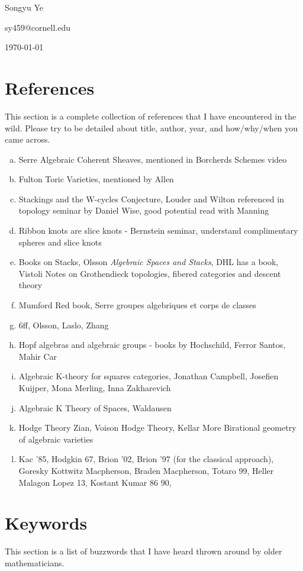 \documentclass[12pt]{article}
\begin{document}
Songyu Ye 

sy459@cornell.edu

\today
\section{References}
This section is a complete collection of references that I have encountered in the wild. Please try to be detailed about title, author, year, and how/why/when you came across.
\begin{enumerate}[(a)]
    \item Serre Algebraic Coherent Sheaves, mentioned in Borcherds Schemes video
    \item Fulton Toric Varieties, mentioned by Allen
    \item Stackings and the W-cycles Conjecture, Louder and Wilton referenced in topology seminar by Daniel Wise, good potential read with Manning
    \item Ribbon knots are slice knots - Bernstein seminar, understand complimentary spheres and slice knots 
    \item Books on Stacks, Olsson \textit{Algebraic Spaces and Stacks}, DHL has a book, Vistoli Notes on Grothendieck topologies, fibered categories and descent theory
    \item Mumford Red book, Serre groupes algebriques et corps de classes
    \item 6ff, Olsson, Laslo, Zhang
    \item Hopf algebras and algebraic groups - books by Hochschild, Ferror Santos, Mahir Car
    \item Algebraic K-theory for squares categories, Jonathan Campbell, Josefien Kuijper, Mona Merling, Inna Zakharevich
    \item Algebraic K Theory of Spaces, Waldausen
    \item Hodge Theory Zian, Voison Hodge Theory, Kellar More Birational geometry of algebraic varieties
    \item Kac '85, Hodgkin 67, Brion '02, Brion '97 (for the classical approach), Goresky Kottwitz Macpherson, Braden Macpherson, Totaro 99, Heller Malagon Lopez 13, Kostant Kumar 86 90, 
 

    
\end{enumerate}

\section{Keywords}
This section is a list of buzzwords that I have heard thrown around by older mathematicians.
\end{document}
